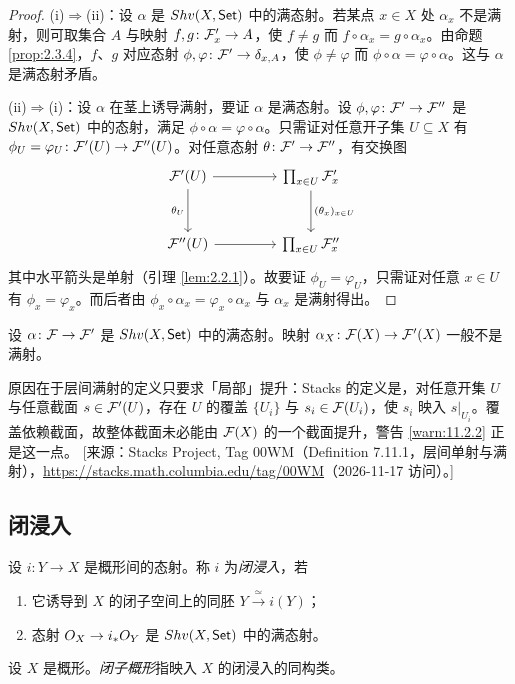 \begin{proof}
(i)$\Rightarrow$(ii)：设 $\alpha$ 是 $Shv(X,\mathsf{Set})$ 中的满态射。若某点 $x \in X$ 处 $\alpha_x$ 不是满射，则可取集合 $A$ 与映射 $f, g \colon \mathcal{F}'_x \to A$，使 $f \neq g$ 而 $f \circ \alpha_x = g \circ \alpha_x$。由命题 \ref{prop:2.3.4}，$f$、$g$ 对应态射 $\phi, \varphi \colon \mathcal{F}' \to \delta_{x,A}$，使 $\phi \neq \varphi$ 而 $\phi \circ \alpha = \varphi \circ \alpha$。这与 $\alpha$ 是满态射矛盾。

(ii)$\Rightarrow$(i)：设 $\alpha$ 在茎上诱导满射，要证 $\alpha$ 是满态射。设 $\phi, \varphi \colon \mathcal{F}' \to \mathcal{F}''$ 是 $Shv(X,\mathsf{Set})$ 中的态射，满足 $\phi \circ \alpha = \varphi \circ \alpha$。只需证对任意开子集 $U \subseteq X$ 有 $\phi_U = \varphi_U \colon \mathcal{F}'(U) \to \mathcal{F}''(U)$。对任意态射 $\theta \colon \mathcal{F}' \to \mathcal{F}''$，有交换图
\[
\begin{tikzcd}[column sep=4.4em,row sep=3em]
\cF'(U) \arrow[r] \arrow[d,"\theta_U"'] & \prod_{x \in U} \cF'_x \arrow[d,"(\theta_x)_{x \in U}"]\\
\cF''(U) \arrow[r] & \prod_{x \in U} \cF''_x
\end{tikzcd}
\]
其中水平箭头是单射（引理 \ref{lem:2.2.1}）。故要证 $\phi_U = \varphi_U$，只需证对任意 $x \in U$ 有 $\phi_x = \varphi_x$。而后者由 $\phi_x \circ \alpha_x = \varphi_x \circ \alpha_x$ 与 $\alpha_x$ 是满射得出。
\end{proof}

\begin{warning}\label{warn:11.2.2}
设 $\alpha \colon \mathcal{F} \to \mathcal{F}'$ 是 $Shv(X,\mathsf{Set})$ 中的满态射。映射 $\alpha_X \colon \mathcal{F}(X) \to \mathcal{F}'(X)$ 一般不是满射。
\end{warning}

\begin{yizhu}
原因在于层间满射的定义只要求「局部」提升：Stacks 的定义是，对任意开集 $U$ 与任意截面 $s \in \mathcal{F}'(U)$，存在 $U$ 的覆盖 $\{U_i\}$ 与 $s_i \in \mathcal{F}(U_i)$，使 $s_i$ 映入 $s|_{U_i}$。覆盖依赖截面，故整体截面未必能由 $\mathcal{F}(X)$ 的一个截面提升，警告 \ref{warn:11.2.2} 正是这一点。
[来源：Stacks Project, Tag 00WM（Definition 7.11.1，层间单射与满射），\url{https://stacks.math.columbia.edu/tag/00WM}（2026-11-17 访问）。]
\end{yizhu}

\subsection{闭浸入}\label{sec:11.3}

\begin{definition}\label{def:11.3.1}
设 $i \colon Y \to X$ 是概形间的态射。称 $i$ 为\emph{闭浸入}，若
\begin{enumerate}[label=(\arabic*),leftmargin=2em,itemsep=0.25ex]
  \item 它诱导到 $X$ 的闭子空间上的同胚 $Y \xrightarrow{\ \simeq\ } i(Y)$；
  \item 态射 $O_X \to i_*O_Y$ 是 $Shv(X,\mathsf{Set})$ 中的满态射。
\end{enumerate}
设 $X$ 是概形。\emph{闭子概形}指映入 $X$ 的闭浸入的同构类。
\end{definition}

